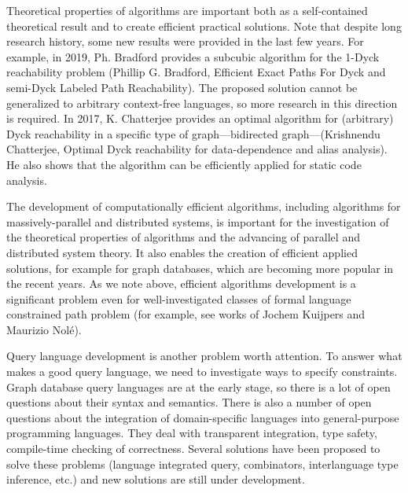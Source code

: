 \documentclass[12pt]{article}  %
\theoremstyle{remark}
\begin{document}
Theoretical properties of algorithms are important both as a self-contained theoretical result and to create efficient practical solutions.
Note that despite long research history, some new results were provided in the last few years. 
For example, in 2019, Ph. Bradford provides a subcubic algorithm for the 1-Dyck reachability problem (Phillip G. Bradford, Efficient Exact Paths For Dyck and semi-Dyck Labeled Path Reachability). 
The proposed solution cannot be generalized to arbitrary context-free languages, so more research in this direction is required.
In 2017, K. Chatterjee provides an optimal algorithm for (arbitrary) Dyck reachability in a specific type of graph---bidirected graph---(Krishnendu Chatterjee, Optimal Dyck reachability for data-dependence and alias analysis). 
He also shows that the algorithm can be efficiently applied for static code analysis.

The development of computationally efficient algorithms, including algorithms for massively-parallel and distributed systems, is important for the investigation of the theoretical properties of algorithms and the advancing of parallel and distributed system theory.
It also enables the creation of efficient applied solutions, for example for graph databases, which are becoming more popular in the recent years. 
As we note above, efficient algorithms development is a significant problem even for well-investigated classes of formal language constrained path problem (for example, see works of Jochem Kuijpers and Maurizio Nolé).

Query language development is another problem worth attention. 
To answer what makes a good query language, we need to investigate ways to specify constraints. 
Graph database query languages are at the early stage, so there is a lot of open questions about their syntax and semantics.
There is also a number of open questions about the integration of domain-specific languages into general-purpose programming languages. 
They deal with transparent integration, type safety, compile-time checking of correctness. 
Several solutions have been proposed to solve these problems (language integrated query, combinators, interlanguage type inference, etc.) and new solutions are still under development.
\end{document}
